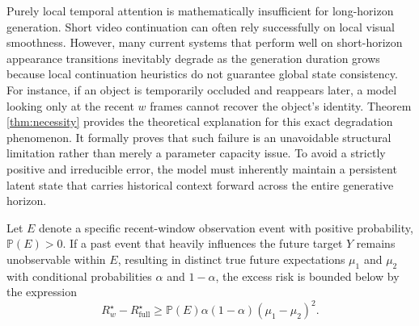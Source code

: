 \documentclass{llmxive}
\begin{document}
\begin{remark}
\normalfont Purely local temporal attention is mathematically insufficient for long-horizon generation. Short video continuation can often rely successfully on local visual smoothness. However, many current systems that perform well on short-horizon appearance transitions inevitably degrade as the generation duration grows because local continuation heuristics do not guarantee global state consistency. For instance, if an object is temporarily occluded and reappears later, a model looking only at the recent $w$ frames cannot recover the object's identity. Theorem \ref{thm:necessity} provides the theoretical explanation for this exact degradation phenomenon. It formally proves that such failure is an unavoidable structural limitation rather than merely a parameter capacity issue. To avoid a strictly positive and irreducible error, the model must inherently maintain a persistent latent state that carries historical context forward across the entire generative horizon.
\end{remark}


\begin{corollary}
\label{cor:lower_bound}
Let $E$ denote a specific recent-window observation event with positive probability, $\mathbb{P}(E)>0$. If a past event that heavily influences the future target $Y$ remains unobservable within $E$, resulting in distinct true future expectations $\mu_1$ and $\mu_2$ with conditional probabilities $\alpha$ and $1-\alpha$, the excess risk is bounded below by the expression
\begin{equation}
R_{w}^\star - R_{\mathrm{full}}^\star \ge \mathbb{P}(E)\alpha(1-\alpha)(\mu_1-\mu_2)^2.
\end{equation}
\end{corollary}
\end{document}
